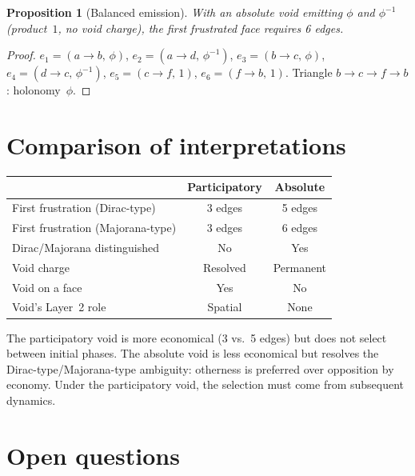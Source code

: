 \documentclass[11pt,a4paper]{article}
\theoremstyle{definition}
\theoremstyle{plain}
\newtheorem{proposition}[definition]{Proposition}
\theoremstyle{remark}
\begin{document}
\begin{proposition}[Balanced emission]\label{prop:balanced}
  With an absolute void emitting $\phi$ and $\phi^{-1}$ (product~$1$, no void charge), the first frustrated face requires 6 edges.
\end{proposition}

\begin{proof}
  $e_1 = (a \to b,\, \phi)$, $e_2 = (a \to d,\, \phi^{-1})$, $e_3 = (b \to c,\, \phi)$, $e_4 = (d \to c,\, \phi^{-1})$, $e_5 = (c \to f,\, 1)$, $e_6 = (f \to b,\, 1)$.  Triangle $b \to c \to f \to b$: holonomy~$\phi$.
\end{proof}

\section{Comparison of interpretations}\label{sec:comparison}

\begin{center}
  \renewcommand{\arraystretch}{1.3}
  \begin{tabular}{p{4.5cm}cc}
    \toprule
    & \textbf{Participatory} & \textbf{Absolute} \\
    \midrule
    First frustration (Dirac-type) & 3 edges & 5 edges \\
    First frustration (Majorana-type) & 3 edges & 6 edges \\
    Dirac/Majorana distinguished & No & Yes \\
    Void charge & Resolved & Permanent \\
    Void on a face & Yes & No \\
    Void's Layer~2 role & Spatial & None \\
    \bottomrule
  \end{tabular}
\end{center}

The participatory void is more economical (3 vs.\ 5 edges) but does not select between initial phases.  The absolute void is less economical but resolves the Dirac-type/Majorana-type ambiguity: otherness is preferred over opposition by economy.  Under the participatory void, the selection must come from subsequent dynamics.

\section{Open questions}\label{sec:open}
\end{document}
